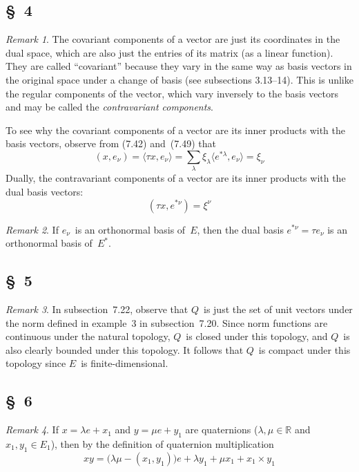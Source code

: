 \documentclass[letterpaper,12pt]{article}
\newcommand{\R}{\mathbb{R}}
\newcommand{\cross}{\times}
\newcommand{\sprod}[2]{\langle#1,#2\rangle}
\newcommand{\iprod}[2]{(#1,#2)}
\theoremstyle{definition}
\theoremstyle{remark}
\newtheorem*{rmk}{Remark}
\begin{document}
\subsection*{\S~4}
\begin{rmk}
The covariant components of a vector are just its coordinates in the dual space, which are also just the entries of its matrix (as a linear function). They are called ``covariant'' because they vary in the same way as basis vectors in the original space under a change of basis (see subsections 3.13--14). This is unlike the regular components of the vector, which vary inversely to the basis vectors and may be called the \emph{contravariant components}.

To see why the covariant components of a vector are its inner products with the basis vectors, observe from (7.42) and~(7.49) that
\[\iprod{x}{e_{\nu}}=\sprod{\tau x}{e_{\nu}}=\sum_{\lambda}\xi_{\lambda}\sprod{e^{*\lambda}}{e_{\nu}}=\xi_{\nu}\]
Dually, the contravariant components of a vector are its inner products with the dual basis vectors:
\[\iprod{\tau x}{e^{*\nu}}=\xi^{\nu}\]
\end{rmk}

\begin{rmk}
If \(e_{\nu}\)~is an orthonormal basis of~\(E\), then the dual basis \(e^{*\nu}=\tau e_{\nu}\) is an orthonormal basis of~\(E^*\).
\end{rmk}

\subsection*{\S~5}
\begin{rmk}
In subsection~7.22, observe that \(Q\)~is just the set of unit vectors under the norm defined in example~3 in subsection~7.20. Since norm functions are continuous under the natural topology, \(Q\)~is closed under this topology, and \(Q\)~is also clearly bounded under this topology. It follows that \(Q\)~is compact under this topology since \(E\)~is finite-dimensional.
\end{rmk}

\subsection*{\S~6}
\begin{rmk}
If \(x=\lambda e+x_1\) and \(y=\mu e+y_1\) are quaternions (\(\lambda,\mu\in\R\) and \(x_1,y_1\in E_1\)), then by the definition of quaternion multiplication
\[xy=\bigl(\lambda\mu-\iprod{x_1}{y_1}\bigr)e+\lambda y_1+\mu x_1+x_1\cross y_1\]
\end{rmk}
\end{document}

